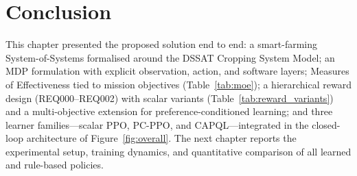 \section{Conclusion}
\label{sec:ch3_conclusion}

This chapter presented the proposed solution end to end: a smart-farming
System-of-Systems formalised around the DSSAT Cropping System Model; an MDP
formulation with explicit observation, action, and software layers;
Measures of Effectiveness tied to mission objectives (Table~\ref{tab:moe});
a hierarchical reward design (REQ000--REQ002) with scalar variants
(Table~\ref{tab:reward_variants}) and a multi-objective extension for
preference-conditioned learning; and three learner families---scalar PPO,
PC-PPO, and CAPQL---integrated in the closed-loop architecture of
Figure~\ref{fig:overall}. The next chapter reports the experimental setup,
training dynamics, and quantitative comparison of all learned and rule-based
policies.


